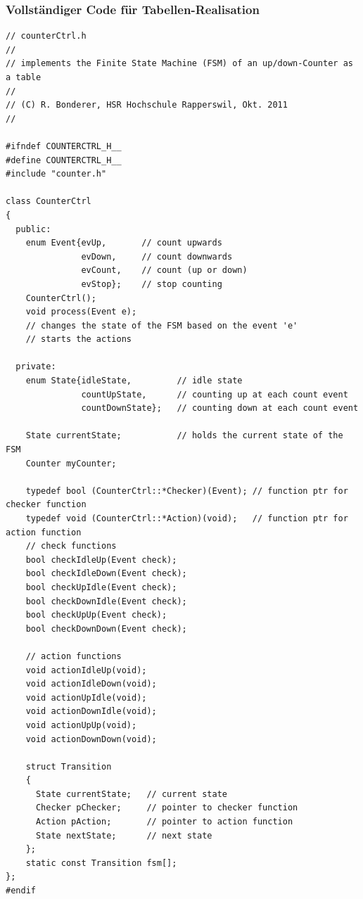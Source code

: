 \subsubsection{Vollständiger Code für Tabellen-Realisation}
\begin{lstlisting}[style=Cpp]
// counterCtrl.h
//
// implements the Finite State Machine (FSM) of an up/down-Counter as a table
//
// (C) R. Bonderer, HSR Hochschule Rapperswil, Okt. 2011
//

#ifndef COUNTERCTRL_H__
#define COUNTERCTRL_H__
#include "counter.h"

class CounterCtrl
{
  public:
    enum Event{evUp,       // count upwards
               evDown,     // count downwards
               evCount,    // count (up or down)
               evStop};    // stop counting
    CounterCtrl();
    void process(Event e);
    // changes the state of the FSM based on the event 'e'
    // starts the actions

  private:
    enum State{idleState,         // idle state
               countUpState,      // counting up at each count event
               countDownState};   // counting down at each count event

    State currentState;           // holds the current state of the FSM
    Counter myCounter;
    
    typedef bool (CounterCtrl::*Checker)(Event); // function ptr for checker function
    typedef void (CounterCtrl::*Action)(void);   // function ptr for action function
    // check functions
    bool checkIdleUp(Event check);
    bool checkIdleDown(Event check);
    bool checkUpIdle(Event check);
    bool checkDownIdle(Event check);
    bool checkUpUp(Event check);
    bool checkDownDown(Event check);
    
    // action functions
    void actionIdleUp(void);
    void actionIdleDown(void);
    void actionUpIdle(void);
    void actionDownIdle(void);
    void actionUpUp(void);
    void actionDownDown(void);
    
    struct Transition
    {
      State currentState;   // current state
      Checker pChecker;     // pointer to checker function
      Action pAction;       // pointer to action function
      State nextState;      // next state
    };
    static const Transition fsm[];
};
#endif
\end{lstlisting}

